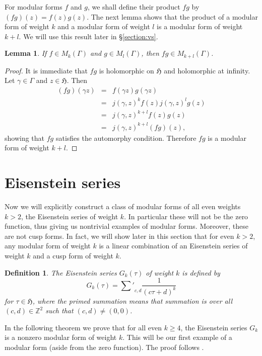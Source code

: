 \documentclass{article}
\newtheorem{lemma}[theorem]{Lemma}
\newtheorem{definition}[theorem]{Definition}
\begin{document}
For modular forms $f$ and $g$, we shall define their product $fg$ by $(fg)(z)=f(z)g(z)$. The next lemma shows that
the product of a modular form of weight $k$ and a modular form of weight $l$ is a modular form of weight $k+l$. We will use
this result later in \S \ref{section:vs}.

\begin{lemma}
If $f \in M_k(\Gamma)$ and $g \in M_l(\Gamma)$, then $fg \in M_{k+l}(\Gamma)$.
\end{lemma}
\begin{proof}
It is immediate that $fg$ is holomorphic on $\mathfrak{H}$ and holomorphic at infinity. Let $\gamma \in \Gamma$ and $z \in \mathfrak{H}$. Then
\begin{eqnarray*}
(fg)(\gamma z)&=&f(\gamma z)g(\gamma z)\\
&=&j(\gamma,z)^k f(z) j(\gamma,z)^l g(z)\\
&=&j(\gamma,z)^{k+l} f(z)g(z)\\
&=&j(\gamma,z)^{k+l} (fg)(z),
\end{eqnarray*}
showing that $fg$ satisfies the automorphy condition. Therefore $fg$ is a modular form of weight $k+l$.
\end{proof}

\section{Eisenstein series}
Now we will explicitly construct a class of modular forms of all even weights $k>2$, the
Eisenstein series of weight $k$. In particular these will not be the zero function,
thus giving us nontrivial examples of modular forms. Moreover, these are not cusp forms. In fact, we will show later in this
section that for even $k>2$, any modular form of weight $k$ is a linear combination of an Eisenstein series of weight $k$
and a cusp form of weight $k$.

\begin{definition}
The {\em Eisenstein series $G_k(\tau)$ of weight $k$} 
is defined by
\[
G_k(\tau)={{\sum}'}_{c,d} \frac{1}{(c\tau+d)^k}
\]
for $\tau \in \mathfrak{H}$, where the primed summation means that summation is over
all $(c,d) \in \mathbb{Z}^2$ such that $(c,d) \neq (0,0)$.
\end{definition}

In the following theorem we prove that for all even $k \geq 4$, the Eisenstein series $G_k$ is a nonzero modular form of weight $k$. This will be our first example of a modular form (aside from the zero function). The proof follows \cite[Theorem 1, Chapter III]{MR0412107}.
\end{document}
